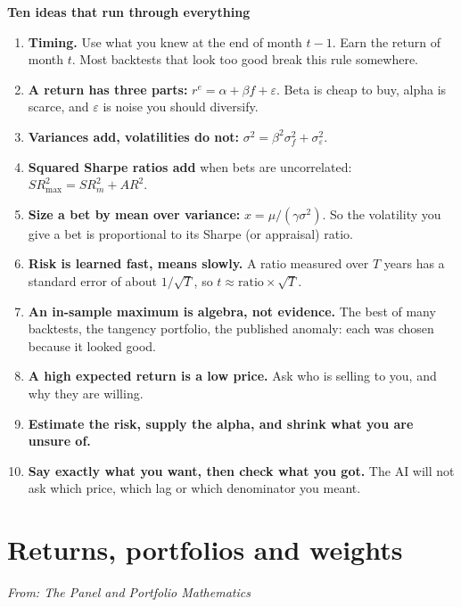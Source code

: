 \documentclass[11pt]{article}
\newcounter{ex}[section]
\newcommand{\head}[1]{\par\medskip\textbf{#1}\par}
\newcommand{\re}{r^{e}}
\newcommand{\SR}{\mathit{SR}}
\newcommand{\AR}{\mathit{AR}}
\begin{document}
\head{Ten ideas that run through everything}
\begin{enumerate}[itemsep=1pt]
\item \textbf{Timing.} Use what you knew at the end of month $t-1$. Earn the return of month $t$. Most backtests that look
too good break this rule somewhere.
\item \textbf{A return has three parts:} $\re = \alpha + \beta f + \varepsilon$. Beta is cheap to buy, alpha is scarce, and
$\varepsilon$ is noise you should diversify.
\item \textbf{Variances add, volatilities do not:} $\sigma^{2} = \beta^{2}\sigma_{f}^{2} + \sigma_{\varepsilon}^{2}$.
\item \textbf{Squared Sharpe ratios add} when bets are uncorrelated: $\SR^{2}_{\max} = \SR_{m}^{2} + \AR^{2}$.
\item \textbf{Size a bet by mean over variance:} $x = \mu/(\gamma\sigma^{2})$. So the volatility you give a bet is proportional to its
Sharpe (or appraisal) ratio.
\item \textbf{Risk is learned fast, means slowly.} A ratio measured over $T$ years has a standard error of about
$1/\sqrt{T}$, so $t \approx \text{ratio}\times\sqrt{T}$.
\item \textbf{An in-sample maximum is algebra, not evidence.} The best of many backtests, the tangency portfolio, the published
anomaly: each was chosen because it looked good.
\item \textbf{A high expected return is a low price.} Ask who is selling to you, and why they are willing.
\item \textbf{Estimate the risk, supply the alpha, and shrink what you are unsure of.}
\item \textbf{Say exactly what you want, then check what you got.} The AI will not ask which price, which lag or which
denominator you meant.
\end{enumerate}

\tableofcontents
\newpage

\section{Returns, portfolios and weights}
{\small\emph{From: The Panel and Portfolio Mathematics}}
\end{document}
